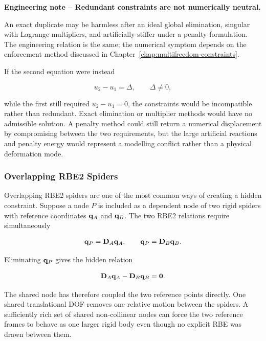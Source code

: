 \begin{bbox}
\textbf{Engineering note -- Redundant constraints are not numerically neutral.}

An exact duplicate may be harmless after an ideal global elimination, singular
with Lagrange multipliers, and artificially stiffer under a penalty formulation.
The engineering relation is the same; the numerical symptom depends on the
enforcement method discussed in Chapter~\ref{chap:multifreedom-constraints}.
\end{bbox}

If the second equation were instead

\begin{equation}
    u_2-u_1=\Delta,\qquad \Delta\neq0,
\end{equation}

while the first still required $u_2-u_1=0$, the constraints would be
incompatible rather than redundant. Exact elimination or multiplier methods
would have no admissible solution. A penalty method could still return a
numerical displacement by compromising between the two requirements, but the
large artificial reactions and penalty energy would represent a modelling
conflict rather than a physical deformation mode.

\subsubsection{Overlapping RBE2 Spiders}

Overlapping RBE2 spiders are one of the most common ways of creating a hidden
constraint. Suppose a node $P$ is included as a dependent node of two rigid
spiders with reference coordinates $\mathbf{q}_A$ and $\mathbf{q}_B$. The two RBE2
relations require simultaneously

\begin{equation}
    \mathbf{q}_P=\mathbf{D}_A\mathbf{q}_A,
    \qquad
    \mathbf{q}_P=\mathbf{D}_B\mathbf{q}_B.
\end{equation}

Eliminating $\mathbf{q}_P$ gives the hidden relation

\begin{equation}\label{overlapping-rbe2-hidden}
    \mathbf{D}_A\mathbf{q}_A-\mathbf{D}_B\mathbf{q}_B=\mathbf{0}.
\end{equation}

The shared node has therefore coupled the two reference points directly. One
shared translational DOF removes one relative motion between the spiders. A
sufficiently rich set of shared non-collinear nodes can force the two reference
frames to behave as one larger rigid body even though no explicit RBE was drawn
between them.

